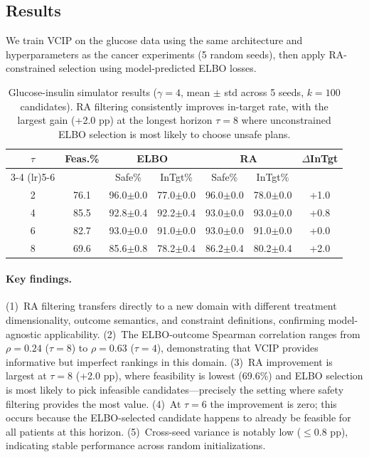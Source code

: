 \documentclass{article}
\begin{document}
\subsection{Results}

We train VCIP on the glucose data using the same architecture and hyperparameters as the cancer experiments (5 random seeds), then apply RA-constrained selection using model-predicted ELBO losses.

\begin{table}[h]
\centering
\caption{Glucose-insulin simulator results ($\gamma = 4$, mean $\pm$ std across 5 seeds, $k=100$ candidates). RA filtering consistently improves in-target rate, with the largest gain (+2.0 pp) at the longest horizon $\tau = 8$ where unconstrained ELBO selection is most likely to choose unsafe plans.}
\label{tab:glucose}
\begin{tabular}{ccccccc}
\toprule
\multirow{2}{*}{$\tau$} & \multirow{2}{*}{Feas.\%} & \multicolumn{2}{c}{ELBO} & \multicolumn{2}{c}{RA} & \multirow{2}{*}{$\Delta$InTgt} \\
\cmidrule(lr){3-4} \cmidrule(lr){5-6}
& & Safe\% & InTgt\% & Safe\% & InTgt\% & \\
\midrule
2 & 76.1 & 96.0\scriptsize{$\pm$0.0} & 77.0\scriptsize{$\pm$0.0} & 96.0\scriptsize{$\pm$0.0} & 78.0\scriptsize{$\pm$0.0} & +1.0 \\
4 & 85.5 & 92.8\scriptsize{$\pm$0.4} & 92.2\scriptsize{$\pm$0.4} & 93.0\scriptsize{$\pm$0.0} & 93.0\scriptsize{$\pm$0.0} & +0.8 \\
6 & 82.7 & 93.0\scriptsize{$\pm$0.0} & 91.0\scriptsize{$\pm$0.0} & 93.0\scriptsize{$\pm$0.0} & 91.0\scriptsize{$\pm$0.0} & +0.0 \\
8 & 69.6 & 85.6\scriptsize{$\pm$0.8} & 78.2\scriptsize{$\pm$0.4} & 86.2\scriptsize{$\pm$0.4} & 80.2\scriptsize{$\pm$0.4} & +2.0 \\
\bottomrule
\end{tabular}
\end{table}

\paragraph{Key findings.}
(1)~RA filtering transfers directly to a new domain with different treatment dimensionality, outcome semantics, and constraint definitions, confirming model-agnostic applicability. (2)~The ELBO-outcome Spearman correlation ranges from $\rho = 0.24$ ($\tau = 8$) to $\rho = 0.63$ ($\tau = 4$), demonstrating that VCIP provides informative but imperfect rankings in this domain. (3)~RA improvement is largest at $\tau = 8$ (+2.0 pp), where feasibility is lowest (69.6\%) and ELBO selection is most likely to pick infeasible candidates---precisely the setting where safety filtering provides the most value. (4)~At $\tau = 6$ the improvement is zero; this occurs because the ELBO-selected candidate happens to already be feasible for all patients at this horizon. (5)~Cross-seed variance is notably low ($\leq 0.8$ pp), indicating stable performance across random initializations.
\end{document}
